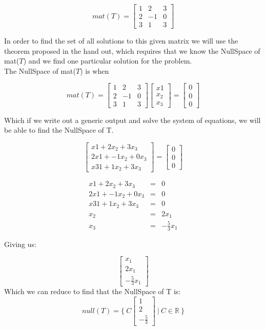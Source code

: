 \documentclass[12pt]{article}
\begin{document}
\[
mat(T) = 
\begin{bmatrix}
1 & 2 & 3\\
2 & -1 & 0\\
3 & 1 & 3 
\end{bmatrix}
\]

In order to find the set of all solutions to this given matrix we will use the theorem proposed in the hand out, which requires that we know the NullSpace of mat($T$) and we find one particular solution for the problem.\\

The NullSpace of mat($T$) is when 

\[
mat(T) = 
\begin{bmatrix}
1 & 2 & 3\\
2 & -1 & 0\\
3 & 1 & 3 
\end{bmatrix}
\begin{bmatrix}
x{1}\\
x_{2}\\
x_{3}
\end{bmatrix}
=
\begin{bmatrix}
0\\
0\\
0
\end{bmatrix}
\]

Which if we write out a generic output and solve the system of equations, we will be able to find the NullSpace of T.

\[
\begin{bmatrix}
x{1} + 2x_{2} + 3x_{3}\\
2x{1} + -1x_{2} + 0x_{3}\\
x3{1} + 1x_{2} + 3x_{3}
\end{bmatrix}
=
\begin{bmatrix}
0\\
0\\
0
\end{bmatrix}
\]

\begin{eqnarray*}
x{1} + 2x_{2} + 3x_{3} &=& 0 \\
2x{1} + -1x_{2} + 0x_{3} &=& 0 \\
x3{1} + 1x_{2} + 3x_{3} &=& 0 \\
x_{2} &=& 2x_{1}\\
x_{3} &=& -\frac{5}{3}x_{1}
\end{eqnarray*}

Giving us:

\[
\begin{bmatrix}
x_{1}\\
2x_{1}\\
-\frac{5}{3}x_{1}
\end{bmatrix}
\]
Which we can reduce to find that the NullSpace of T is:
\[
null(T) = 
\{ \ C
\begin{bmatrix}
1\\
2\\
-\frac{5}{3}
\end{bmatrix}
\ | \
C \in \mathbb{R} \ \}
\]
\end{document}
